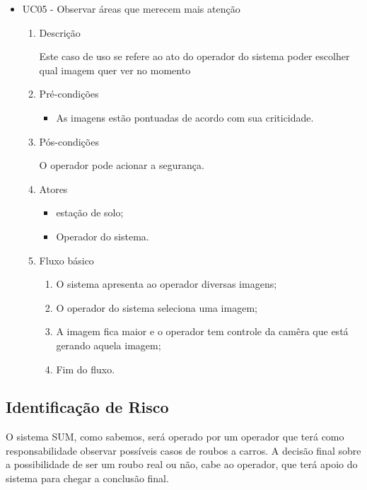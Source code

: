 \begin{itemize}
				\item UC05 - Observar áreas que merecem mais atenção
					\begin{enumerate}
						\item Descrição

							Este caso de uso se refere ao ato do operador do sistema poder escolher qual imagem quer ver no momento
						\item Pré-condições
							\begin{itemize}
								\item As imagens estão pontuadas de acordo com sua criticidade.
							\end{itemize}

						\item Pós-condições

						O operador pode acionar a segurança.

						\item Atores
							\begin{itemize}
								\item estação de solo;
								\item Operador do sistema.
							\end{itemize}


						\item Fluxo básico
							\begin{enumerate}
								\item O sistema apresenta ao operador diversas imagens;
								\item O operador do sistema seleciona uma imagem;
								\item A imagem fica maior e o operador tem controle da camêra que está gerando aquela imagem;
								\item Fim do fluxo.
							\end{enumerate}
					\end{enumerate}
		\end{itemize}


\subsection{Identificação de Risco} %
\label{sub:identifica_o_de_risco}


	O sistema SUM, como sabemos, será operado por um operador que terá como responsabilidade observar possíveis casos de roubos a carros. A decisão final sobre a possibilidade de ser um roubo real ou não, cabe ao operador, que terá apoio do sistema para chegar a conclusão final.

